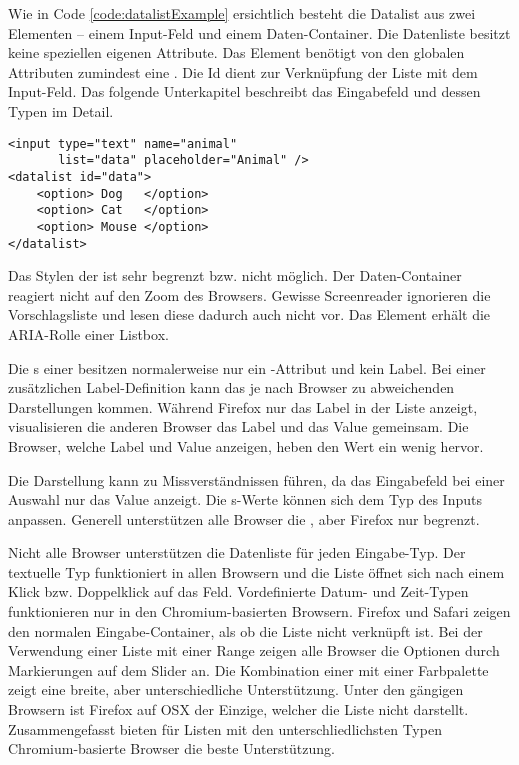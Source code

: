 Wie in Code \ref{code:datalistExample} ersichtlich besteht die Datalist aus zwei Elementen – einem Input-Feld und einem Daten-Container. 
Die Datenliste besitzt keine speziellen eigenen Attribute. 
Das Element benötigt von den globalen Attributen zumindest eine . 
Die Id dient zur Verknüpfung der Liste mit dem Input-Feld. 
Das folgende Unterkapitel \textbf{} beschreibt das Eingabefeld und dessen Typen im Detail. 

\begin{lstlisting}[style = htmlcssjs, caption = Datalist Beispiel, label = code:datalistExample]
<input type="text" name="animal" 
       list="data" placeholder="Animal" />
<datalist id="data">
    <option> Dog   </option>
    <option> Cat   </option>
    <option> Mouse </option>
</datalist>
\end{lstlisting}

Das Stylen der  ist sehr begrenzt bzw. nicht möglich. 
Der Daten-Container reagiert nicht auf den Zoom des Browsers. 
Gewisse Screenreader ignorieren die Vorschlagsliste und lesen diese dadurch auch nicht vor. 
Das Element erhält die ARIA-Rolle einer Listbox. 

Die s einer  besitzen normalerweise nur ein -Attribut und kein Label. 
Bei einer zusätzlichen Label-Definition kann das je nach Browser zu abweichenden Darstellungen kommen. 
Während Firefox nur das Label in der Liste anzeigt, visualisieren die anderen Browser das Label und das Value gemeinsam. 
Die Browser, welche Label und Value anzeigen, heben den Wert ein wenig hervor. 

Die Darstellung kann zu Missverständnissen führen, da das Eingabefeld bei einer Auswahl nur das Value anzeigt. 
Die s-Werte können sich dem Typ des Inputs anpassen. 
Generell unterstützen alle Browser die , aber Firefox nur begrenzt. 

Nicht alle Browser unterstützen die Datenliste für jeden Eingabe-Typ. 
Der textuelle Typ funktioniert in allen Browsern und die Liste öffnet sich nach einem Klick bzw. Doppelklick auf das Feld. 
Vordefinierte Datum- und Zeit-Typen funktionieren nur in den Chromium-basierten Browsern. 
Firefox und Safari zeigen den normalen Eingabe-Container, als ob die Liste nicht verknüpft ist. 
Bei der Verwendung einer Liste mit einer Range zeigen alle Browser die Optionen durch Markierungen auf dem Slider an. 
Die Kombination einer  mit einer Farbpalette zeigt eine breite, aber unterschiedliche Unterstützung. 
Unter den gängigen Browsern ist Firefox auf OSX der Einzige, welcher die Liste nicht darstellt. 
Zusammengefasst bieten für Listen mit den unterschliedlichsten Typen Chromium-basierte Browser die beste Unterstützung. 



